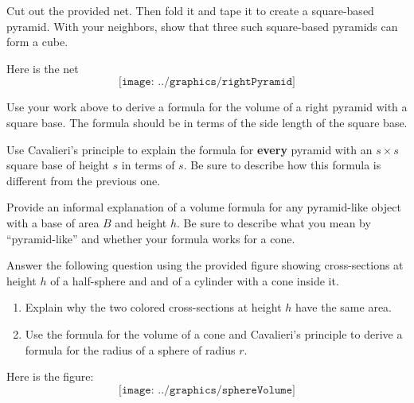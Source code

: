 \begin{prob}
Cut out the provided net.  Then fold it and tape it to create a square-based pyramid.  With your neighbors, show that three such square-based pyramids can form a cube.  
\end{prob}
\begin{teachingnote}
Here is the net
$$\texttt{[image: ../graphics/rightPyramid]}$$
\end{teachingnote}

\begin{prob}
Use your work above to derive a formula for the volume of a
right pyramid with a square base. The formula should be in terms of
the side length of the square base.
\end{prob}

\begin{prob}
Use Cavalieri's principle to explain the formula for \textbf{every} pyramid with an $s\times s$ square base of height $s$ in terms of $s$.  Be sure to describe how this formula is different from the previous one.  
\end{prob}

\begin{prob}
Provide an informal explanation of a volume formula for any pyramid-like object with a base of area $B$ and height $h$.  Be sure to describe what you mean by ``pyramid-like'' and whether your formula works for a cone.  
\end{prob}

\begin{prob}
Answer the following question using the provided figure showing cross-sections at height $h$ of a half-sphere and and of a cylinder with a cone inside it.  
\begin{enumerate}
\item Explain why the two colored cross-sections at height $h$ have the same area. 
\item Use the formula for the volume of a cone and Cavalieri's principle to derive a formula for the radius of a sphere of radius $r$.  
\end{enumerate}
\end{prob}

\begin{teachingnote}
Here is the figure:  
$$\texttt{[image: ../graphics/sphereVolume]}$$
\end{teachingnote}

